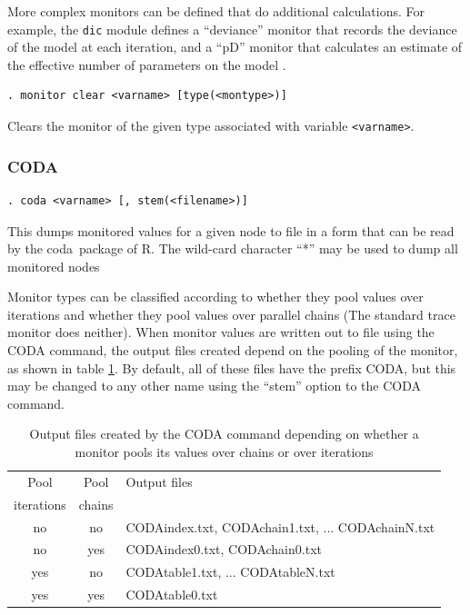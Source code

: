 \documentclass[11pt, a4paper, titlepage]{report}
\newcommand{\R}{\textsf{R}}
\newcommand{\CODA}{\textsf{coda}}
\begin{document}
More complex monitors can be defined that do additional calculations.
For example, the \texttt{dic} module defines a ``deviance'' monitor that
records the deviance of the model at each iteration, and a ``pD''
monitor that calculates an estimate of the effective number of
parameters on the model \citep{spiegelhalter:etal:2002}.  

\begin{verbatim}
. monitor clear <varname> [type(<montype>)]
\end{verbatim}
Clears the monitor of the given type associated with variable
\texttt{<varname>}. 

\subsubsection{CODA}
\label{coda}

\begin{verbatim}
. coda <varname> [, stem(<filename>)]
\end{verbatim}
This dumps monitored values for a given node to file in a form that
can be read by the \CODA\ package of \R.  The wild-card character
``*'' may be used to dump all monitored nodes

Monitor types can be classified according to whether they pool values
over iterations and whether they pool values over parallel chains (The
standard trace monitor does neither). When monitor values are written
out to file using the CODA command, the output files created depend on
the pooling of the monitor, as shown in table \ref{table:coda}. By
default, all of these files have the prefix CODA, but this may be
changed to any other name using the ``stem'' option to the CODA
command.

\begin{table}[h]
\begin{tabular}{ccl}
\hline
Pool       & Pool   & Output files \\
iterations & chains &              \\
\hline
no         & no     & CODAindex.txt, CODAchain1.txt, ... 
                      CODAchainN.txt \\
no         & yes    & CODAindex0.txt, CODAchain0.txt \\
yes        & no     & CODAtable1.txt, ... CODAtableN.txt \\
yes        & yes    & CODAtable0.txt \\
\hline
\end{tabular}
\caption{Output files created by the CODA command depending on whether
a monitor pools its values over chains or over iterations \label{table:coda}}
\end{table}
\end{document}
